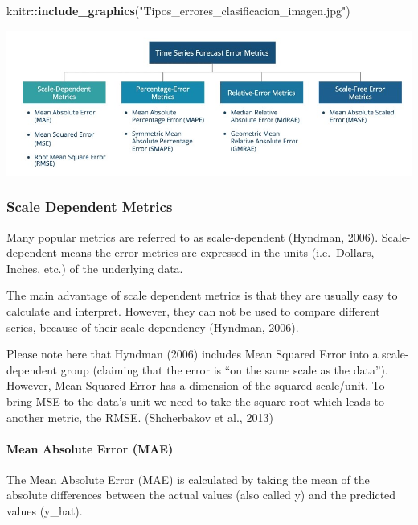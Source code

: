 \documentclass[
]{article}
\newenvironment{Shaded}{\begin{snugshade}}{\end{snugshade}}
\newcommand{\FunctionTok}[1]{\textcolor[rgb]{0.13,0.29,0.53}{\textbf{#1}}}
\newcommand{\NormalTok}[1]{#1}
\newcommand{\SpecialCharTok}[1]{\textcolor[rgb]{0.81,0.36,0.00}{\textbf{#1}}}
\newcommand{\StringTok}[1]{\textcolor[rgb]{0.31,0.60,0.02}{#1}}
\begin{document}
\begin{Shaded}
\begin{Highlighting}[]
\NormalTok{knitr}\SpecialCharTok{::}\FunctionTok{include\_graphics}\NormalTok{(}\StringTok{"Tipos\_errores\_clasificacion\_imagen.jpg"}\NormalTok{)}
\end{Highlighting}
\end{Shaded}

\includegraphics{Tipos_errores_clasificacion_imagen.jpg}

\hypertarget{scale-dependent-metrics}{%
\subsubsection{Scale Dependent Metrics}\label{scale-dependent-metrics}}

Many popular metrics are referred to as scale-dependent (Hyndman, 2006).
Scale-dependent means the error metrics are expressed in the units
(i.e.~Dollars, Inches, etc.) of the underlying data.

The main advantage of scale dependent metrics is that they are usually
easy to calculate and interpret. However, they can not be used to
compare different series, because of their scale dependency (Hyndman,
2006).

Please note here that Hyndman (2006) includes Mean Squared Error into a
scale-dependent group (claiming that the error is ``on the same scale as
the data''). However, Mean Squared Error has a dimension of the squared
scale/unit. To bring MSE to the data's unit we need to take the square
root which leads to another metric, the RMSE. (Shcherbakov et al., 2013)

\hypertarget{mean-absolute-error-mae}{%
\paragraph{Mean Absolute Error (MAE)}\label{mean-absolute-error-mae}}

The Mean Absolute Error (MAE) is calculated by taking the mean of the
absolute differences between the actual values (also called y) and the
predicted values (y\_hat).
\end{document}

